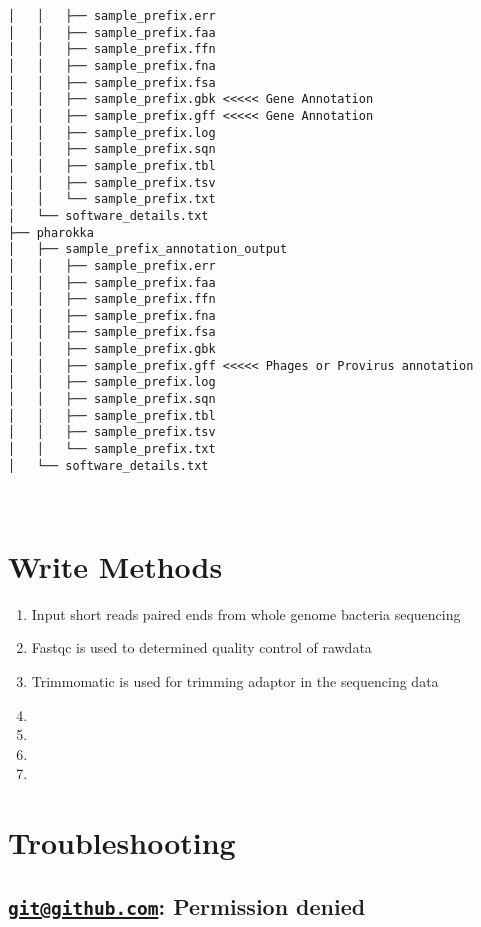 \documentclass[
]{book}
\providecommand{\tightlist}{%
  \setlength{\itemsep}{0pt}\setlength{\parskip}{0pt}}
\begin{document}
\begin{verbatim}
│   │   ├── sample_prefix.err
│   │   ├── sample_prefix.faa
│   │   ├── sample_prefix.ffn
│   │   ├── sample_prefix.fna
│   │   ├── sample_prefix.fsa
│   │   ├── sample_prefix.gbk <<<<< Gene Annotation
│   │   ├── sample_prefix.gff <<<<< Gene Annotation
│   │   ├── sample_prefix.log
│   │   ├── sample_prefix.sqn
│   │   ├── sample_prefix.tbl
│   │   ├── sample_prefix.tsv
│   │   └── sample_prefix.txt
│   └── software_details.txt
├── pharokka
│   ├── sample_prefix_annotation_output
│   │   ├── sample_prefix.err
│   │   ├── sample_prefix.faa
│   │   ├── sample_prefix.ffn
│   │   ├── sample_prefix.fna
│   │   ├── sample_prefix.fsa
│   │   ├── sample_prefix.gbk
│   │   ├── sample_prefix.gff <<<<< Phages or Provirus annotation
│   │   ├── sample_prefix.log
│   │   ├── sample_prefix.sqn
│   │   ├── sample_prefix.tbl
│   │   ├── sample_prefix.tsv
│   │   └── sample_prefix.txt
│   └── software_details.txt

  
\end{verbatim}

\hypertarget{write-methods}{%
\chapter{Write Methods}\label{write-methods}}

\begin{enumerate}
\def\labelenumi{\arabic{enumi}.}
\tightlist
\item
  Input short reads paired ends from whole genome bacteria sequencing
\item
  Fastqc is used to determined quality control of rawdata
\item
  Trimmomatic is used for trimming adaptor in the sequencing data
\item
\item
\item
\item
\end{enumerate}

\hypertarget{troubleshooting}{%
\chapter{Troubleshooting}\label{troubleshooting}}

\hypertarget{gitgithub.com-permission-denied}{%
\section{\texorpdfstring{\href{mailto:git@github.com}{\nolinkurl{git@github.com}}: Permission denied}{git@github.com: Permission denied}}\label{gitgithub.com-permission-denied}}
\end{document}
